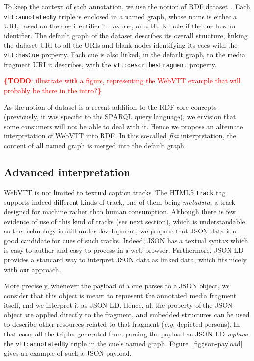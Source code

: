 \documentclass{sig-alternate}
\newcommand{\todo}[1]{\noindent\textcolor{red}{{\bf \{TODO}: #1{\bf \}}}}
\newcommand{\vtt}[1]{\texttt{vtt:#1}}
\begin{document}
To keep the context of each annotation,
we use the notion of RDF dataset~\cite{cyganiak2014rdf11concepts}.
Each \vtt{annotatedBy} triple is enclosed in a named graph,
whose name is either a URI, based on the cue identifier it has one,
or a blank node if the cue has no identifier.
The default graph of the dataset describes its overall structure,
linking the dataset URI to all the URIs and blank nodes identifying its cues
with the \vtt{hasCue} property.
Each cue is also linked, in the default graph, to the media fragment URI it describes,
with the \vtt{describesFragment} property. 

\todo{illustrate with a figure, representing the WebVTT example that will probably be there in the intro?}

As the notion of dataset is a recent addition to the RDF core concepts
(previously, it was specific to the SPARQL query language),
we envision that some consumers will not be able to deal with it.
Hence we propose an alternate interpretation of WebVTT into RDF.
In this so-called \emph{flat} interpretation,
the content of all named graph is merged into the default graph.

\subsection{Advanced interpretation}

WebVTT is not limited to textual caption tracks.
The HTML5 \texttt{track} tag supports indeed different kinds of track,
one of them being \textit{metadata},
a track designed for machine rather than human consumption.
Although there is few evidence of use of this kind of tracks (see next section),
which is understandable as the technology is still under development,
we propose that JSON data is a good candidate for cues of such tracks.
Indeed, JSON has a textual syntax which is easy to author
and easy to process in a web browser.
Furthermore, JSON-LD~\cite{sporny2013jsonld} provides
a standard way to interpret JSON data as linked data,
which fits nicely with our approach.

More precisely, whenever the payload of a cue parses to a JSON object,
we consider that this object is meant to represent the annotated media fragment itself,
and we interpret it as JSON-LD.
Hence, all the property of the JSON object are applied directly to the fragment,
and embedded structures can be used to describe other resources related to that fragment
(\textit{e.g.} depicted persons).
In that case, all the triples generated from parsing the payload as JSON-LD
\emph{replace} the \vtt{annotatedBy} triple in the cue's named graph.
Figure~\ref{fig:json-payload} gives an example of such a JSON payload.
\end{document}

